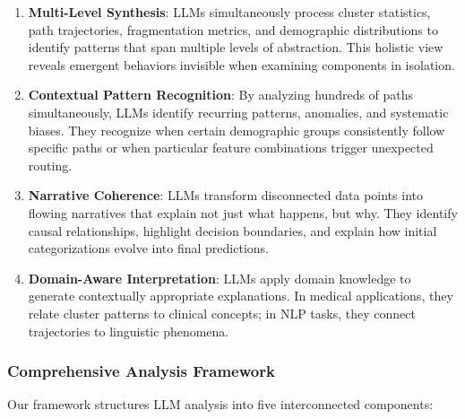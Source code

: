 \begin{enumerate}
    \item \textbf{Multi-Level Synthesis}: LLMs simultaneously process cluster statistics, path trajectories, fragmentation metrics, and demographic distributions to identify patterns that span multiple levels of abstraction. This holistic view reveals emergent behaviors invisible when examining components in isolation.
    
    \item \textbf{Contextual Pattern Recognition}: By analyzing hundreds of paths simultaneously, LLMs identify recurring patterns, anomalies, and systematic biases. They recognize when certain demographic groups consistently follow specific paths or when particular feature combinations trigger unexpected routing.
    
    \item \textbf{Narrative Coherence}: LLMs transform disconnected data points into flowing narratives that explain not just what happens, but why. They identify causal relationships, highlight decision boundaries, and explain how initial categorizations evolve into final predictions.
    
    \item \textbf{Domain-Aware Interpretation}: LLMs apply domain knowledge to generate contextually appropriate explanations. In medical applications, they relate cluster patterns to clinical concepts; in NLP tasks, they connect trajectories to linguistic phenomena.
\end{enumerate}

\subsubsection{Comprehensive Analysis Framework}

Our framework structures LLM analysis into five interconnected components:

